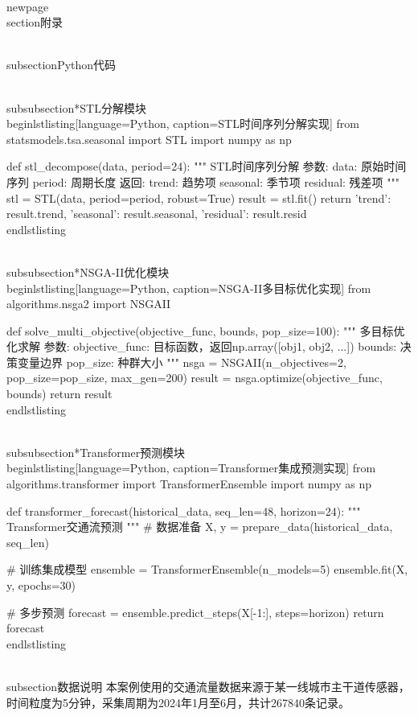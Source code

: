 \\newpage
\\section{附录}

\\subsection{Python代码}

\\subsubsection*{STL分解模块}
\\begin{lstlisting}[language=Python, caption={STL时间序列分解实现}]
from statsmodels.tsa.seasonal import STL
import numpy as np

def stl_decompose(data, period=24):
    """
    STL时间序列分解
    参数:
        data: 原始时间序列
        period: 周期长度
    返回:
        trend: 趋势项
        seasonal: 季节项
        residual: 残差项
    """
    stl = STL(data, period=period, robust=True)
    result = stl.fit()
    return {
        'trend': result.trend,
        'seasonal': result.seasonal,
        'residual': result.resid
    }
\\end{lstlisting}

\\subsubsection*{NSGA-II优化模块}
\\begin{lstlisting}[language=Python, caption={NSGA-II多目标优化实现}]
from algorithms.nsga2 import NSGAII

def solve_multi_objective(objective_func, bounds, pop_size=100):
    """
    多目标优化求解
    参数:
        objective_func: 目标函数，返回np.array([obj1, obj2, ...])
        bounds: 决策变量边界
        pop_size: 种群大小
    """
    nsga = NSGAII(n_objectives=2, pop_size=pop_size, max_gen=200)
    result = nsga.optimize(objective_func, bounds)
    return result
\\end{lstlisting}

\\subsubsection*{Transformer预测模块}
\\begin{lstlisting}[language=Python, caption={Transformer集成预测实现}]
from algorithms.transformer import TransformerEnsemble
import numpy as np

def transformer_forecast(historical_data, seq_len=48, horizon=24):
    """
    Transformer交通流预测
    """
    # 数据准备
    X, y = prepare_data(historical_data, seq_len)
    
    # 训练集成模型
    ensemble = TransformerEnsemble(n_models=5)
    ensemble.fit(X, y, epochs=30)
    
    # 多步预测
    forecast = ensemble.predict_steps(X[-1:], steps=horizon)
    return forecast
\\end{lstlisting}

\\subsection{数据说明}
本案例使用的交通流量数据来源于某一线城市主干道传感器，时间粒度为5分钟，采集周期为2024年1月至6月，共计267840条记录。
